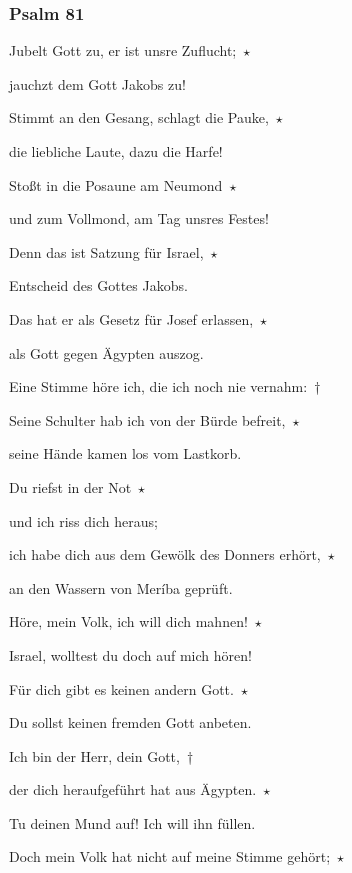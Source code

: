 \subsubsection{Psalm 81}

\noindent Jubelt Gott zu, er ist unsre Zuflucht;~$\star$~\nopagebreak

jauchzt dem Gott Jakobs zu!

\noindent Stimmt an den Gesang, schlagt die Pauke,~$\star$~\nopagebreak

die liebliche Laute, dazu die Harfe! 

\noindent Stoßt in die Posaune am Neumond~$\star$~\nopagebreak

und zum Vollmond, am Tag unsres Festes!

\noindent Denn das ist Satzung für Israel,~$\star$~\nopagebreak

Entscheid des Gottes Jakobs.

\noindent Das hat er als Gesetz für Josef erlassen,~$\star$~\nopagebreak

als Gott gegen Ägypten auszog.

\noindent Eine Stimme höre ich, die ich noch nie vernahm:~†~\nopagebreak

Seine Schulter hab ich von der Bürde befreit,~$\star$~\nopagebreak

seine Hände kamen los vom Lastkorb.

\noindent Du riefst in der Not~$\star$~\nopagebreak

und ich riss dich heraus;

\noindent ich habe dich aus dem Gewölk des Donners erhört,~$\star$~\nopagebreak

an den Wassern von Meríba geprüft.

\noindent Höre, mein Volk, ich will dich mahnen!~$\star$~\nopagebreak

Israel, wolltest du doch auf mich hören!

\noindent Für dich gibt es keinen andern Gott.~$\star$~\nopagebreak

Du sollst keinen fremden Gott anbeten.

\noindent Ich bin der Herr, dein Gott,~†~\nopagebreak

der dich heraufgeführt hat aus Ägypten.~$\star$~\nopagebreak

Tu deinen Mund auf! Ich will ihn füllen.

\noindent Doch mein Volk hat nicht auf meine Stimme gehört;~$\star$~\nopagebreak

